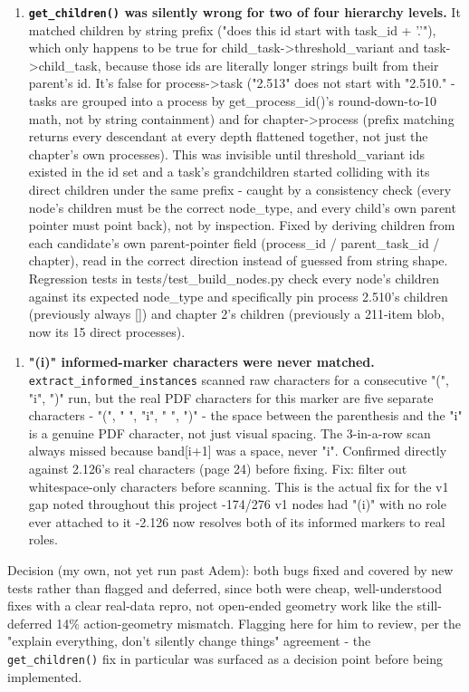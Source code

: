 \begin{enumerate}
\item \textbf{\texttt{get\_\allowbreak{}children()} was silently wrong for two of four hierarchy levels.} It matched children by string prefix ("does this id start with task\_id + '.'"), which only happens to be true for child\_task->threshold\_variant and task->child\_task, because those ids are literally longer strings built from their parent's id. It's false for process->task ("2.513" does not start with "2.510." - tasks are grouped into a process by get\_process\_id()'s round-down-to-10 math, not by string containment) and for chapter->process (prefix matching returns every descendant at every depth flattened together, not just the chapter's own processes). This was invisible until threshold\_variant ids existed in the id set and a task's grandchildren started colliding with its direct children under the same prefix - caught by a consistency check (every node's children must be the correct node\_type, and every child's own parent pointer must point back), not by inspection. Fixed by deriving children from each candidate's own parent-pointer field (process\_id / parent\_task\_id / chapter), read in the correct direction instead of guessed from string shape. Regression tests in tests/test\_build\_nodes.py check every node's children against its expected node\_type and specifically pin process 2.510's children (previously always []) and chapter 2's children (previously a 211-item blob, now its 15 direct processes).
\end{enumerate}
\begin{enumerate}
\item \textbf{"(i)" informed-marker characters were never matched.} \texttt{extract\_\allowbreak{}informed\_\allowbreak{}instances} scanned raw characters for a consecutive "(", "i", ")" run, but the real PDF characters for this marker are five separate characters - "(", " ", "i", " ", ")" - the space between the parenthesis and the "i" is a genuine PDF character, not just visual spacing. The 3-in-a-row scan always missed because band[i+1] was a space, never "i". Confirmed directly against 2.126's real characters (page 24) before fixing. Fix: filter out whitespace-only characters before scanning. This is the actual fix for the v1 gap noted throughout this project -174/276 v1 nodes had "(i)" with no role ever attached to it -2.126 now resolves both of its informed markers to real roles.
\end{enumerate}
Decision (my own, not yet run past Adem): both bugs fixed and covered by new tests rather than flagged and deferred, since both were cheap, well-understood fixes with a clear real-data repro, not open-ended geometry work like the still-deferred 14\% action-geometry mismatch. Flagging here for him to review, per the "explain everything, don't silently change things" agreement - the \texttt{get\_\allowbreak{}children()} fix in particular was surfaced as a decision point before being implemented.

